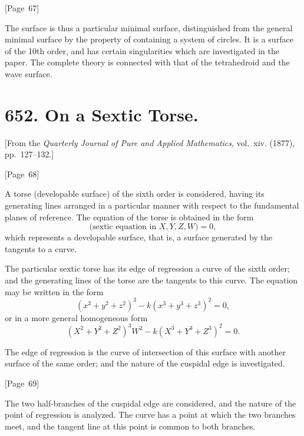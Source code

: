 \documentclass[11pt,a4paper]{book}
\begin{document}
\begin{center}
[Page~67]
\end{center}

The surface is thus a particular minimal surface, distinguished from
the general minimal surface by the property of containing a system of
circles. It is a surface of the 10th order, and has certain
singularities which are investigated in the paper. The complete theory
is connected with that of the tetrahedroid and the wave surface.


\newpage
\section*{652. On a Sextic Torse.}

[From the \textit{Quarterly Journal of Pure and Applied Mathematics},
vol.~xiv. (1877), pp.~127--132.]

\begin{center}
[Page~68]
\end{center}

A torse (developable surface) of the sixth order is considered,
having its generating lines arranged in a particular manner with
respect to the fundamental planes of reference. The equation of the
torse is obtained in the form
\[
\text{(sextic equation in } X, Y, Z, W\text{)} = 0,
\]
which represents a developable surface, that is, a surface generated by
the tangents to a curve.

The particular sextic torse has its edge of regression a curve of the
sixth order; and the generating lines of the torse are the tangents to
this curve. The equation may be written in the form
\[
(x^2 + y^2 + z^2)^3 - k(x^3 + y^3 + z^3)^2 = 0,
\]
or in a more general homogeneous form
\[
(X^2 + Y^2 + Z^2)^3W^2 - k(X^3 + Y^3 + Z^3)^2 = 0.
\]

The edge of regression is the curve of intersection of this surface
with another surface of the same order; and the nature of the
cuspidal edge is investigated.

\begin{center}
[Page~69]
\end{center}

The two half-branches of the cuspidal edge are considered, and the
nature of the point of regression is analyzed. The curve has a point
at which the two branches meet, and the tangent line at this point is
common to both branches.
\end{document}
